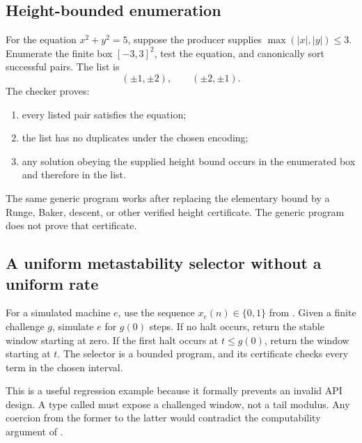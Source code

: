 \subsection{Height-bounded enumeration}

For the equation \(x^2+y^2=5\), suppose the producer supplies \(\max(|x|,|y|)\leq3\).  Enumerate the finite box \([-3,3]^2\), test the equation, and canonically sort successful pairs.  The list is
\[
  (\pm1,\pm2),\qquad(\pm2,\pm1).
\]
The checker proves:
\begin{enumerate}
\item every listed pair satisfies the equation;
\item the list has no duplicates under the chosen encoding;
\item any solution obeying the supplied height bound occurs in the enumerated box and therefore in the list.
\end{enumerate}
The same generic program works after replacing the elementary bound by a Runge, Baker, descent, or other verified height certificate.  The generic program does not prove that certificate.

\subsection{A uniform metastability selector without a uniform rate}

For a simulated machine \(e\), use the sequence \(x_e(n)\in\{0,1\}\) from .  Given a finite challenge \(g\), simulate \(e\) for \(g(0)\) steps.  If no halt occurs, return the stable window starting at zero.  If the first halt occurs at \(t\leq g(0)\), return the window starting at \(t\).  The selector is a bounded program, and its certificate checks every term in the chosen interval.

This is a useful regression example because it formally prevents an invalid API design.  A type called  must expose a challenged window, not a tail modulus.  Any coercion from the former to the latter would contradict the computability argument of .
